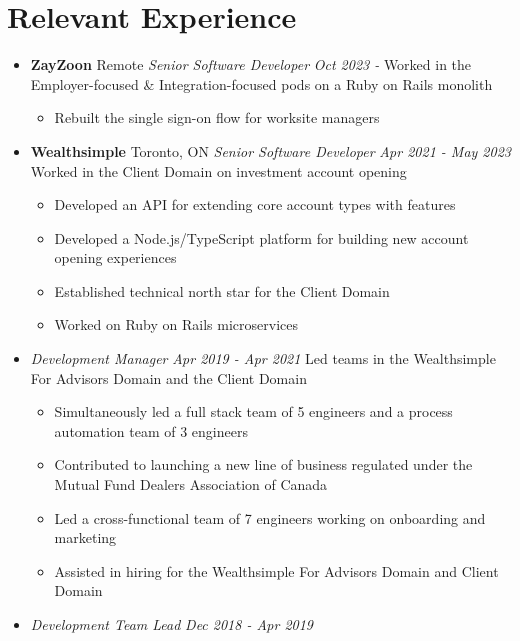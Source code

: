 \documentclass[letterpaper,11pt]{article}
\newcommand{\resumeSubHeading}[4]{
	\item[]
      \textbf{#1} \hfill #2 \newline
      \textit{#3} \hfill \textit{#4}
}
\newcommand{\jobAtSamePlace}[2]{
	\item[]
      \textit{#1} \hfill \textit{#2}
}
\begin{document}
\section{Relevant Experience}
  \begin{itemize}[leftmargin=*]

    \resumeSubHeading
      {ZayZoon}{Remote}
      {Senior Software Developer}{Oct 2023 -}\newline
      Worked in the Employer-focused \& Integration-focused pods on a Ruby on Rails monolith
      \begin{itemize}[noitemsep,topsep=0pt]
        \item Rebuilt the single sign-on flow for worksite managers
      \end{itemize}

    \resumeSubHeading
      {Wealthsimple}{Toronto, ON}
      {Senior Software Developer}{Apr 2021 - May 2023}\newline
      Worked in the Client Domain on investment account opening
      \begin{itemize}[noitemsep,topsep=0pt]
        \item Developed an API for extending core account types with features
      	\item Developed a Node.js/TypeScript platform for building new account opening experiences
        \item Established technical north star for the Client Domain
        \item Worked on Ruby on Rails microservices
      \end{itemize}
      \jobAtSamePlace
      {Development Manager}{Apr 2019 - Apr 2021}\newline
      Led teams in the Wealthsimple For Advisors Domain and the Client Domain 
      \begin{itemize}[noitemsep,topsep=0pt]
      	\item Simultaneously led a full stack team of 5 engineers and a process automation team of 3 engineers
      	\item Contributed to launching a new line of business regulated under the Mutual Fund Dealers Association of Canada
      	\item Led a cross-functional team of 7 engineers working on onboarding and marketing
      	\item Assisted in hiring for the Wealthsimple For Advisors Domain and Client Domain
      \end{itemize}
      \jobAtSamePlace
	  {Development Team Lead}{Dec 2018 - Apr 2019}\newline

\end{itemize}
\end{document}
